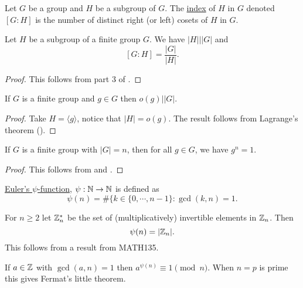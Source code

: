 \documentclass[11pt]{article}
\begin{document}
\begin{definition}
    Let $G$ be a group and $H$ be a subgroup of $G$. The \ul{index} of $H$ in $G$ denoted $[G:H]$ is the number of distinct right (or left) cosets of $H$ in $G$.
\end{definition}

\begin{theorem}
    Let $H$ be a subgroup of a finite group $G$. We have $|H|\big||G|$ and
    \[[G:H]=\frac{|G|}{|H|}.\]
\end{theorem}

\begin{proof}
    This follows from part 3 of .
\end{proof}

\begin{corollary}
    If $G$ is a finite group and $g\in G$ then $o(g)\big||G|$.
\end{corollary}

\begin{proof}
     Take $H=\langle g\rangle$, notice that $|H|=o(g)$. The result follows from Lagrange's theorem ().
\end{proof}

\begin{corollary}
    If $G$ is a finite group with $|G|=n$, then for all $g\in G$, we have $g^n=1$.
\end{corollary}

\begin{proof}
    This follows from  and .
\end{proof}

\begin{definition}
    \ul{Euler's $\psi$-function}, $\psi:\mathbb{N}\to\mathbb{N}$ is defined as
    \[\psi(n)=\#\{k\in\{0,\cdots,n-1\}:\gcd(k,n)=1.\]
\end{definition}

\begin{example}
    For $n\geq 2$ let $\mathbb{Z}_n^*$ be the set of (multiplicatively) invertible elements in $\mathbb{Z}_n$. Then
    \[\psi(n)=|\mathbb{Z}_n|.\]
    This follows from a result from MATH135.
\end{example}

\begin{theorem}
    If $a\in\mathbb{Z}$ with $\gcd(a,n)=1$ then $a^{\psi(n)}\equiv 1\pmod{n}$. When $n=p$ is prime this gives Fermat's little theorem.
\end{theorem}
\end{document}
